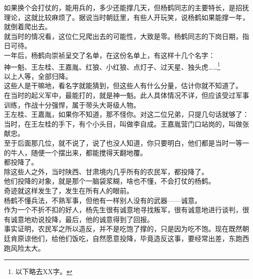 \begin{multicols}{\theparacolNo}
如果换个会打仗的，能用兵的，多少还能撑几天，但杨鹤同志的主要特长，是招抚理论，这就比较麻烦了。据说当时朝廷里，有些人开玩笑，说杨鹤如果能撑一年，就倒着爬出去。\\

就当时的情况看，这位仁兄爬出去的可能性，大致是零。杨鹤同志的下岗日期，指日可待。\\

一年后，杨鹤向崇祯呈交了名单，在这份名单上，有这样十几个名字：\\

神一魁、王左桂、王嘉胤、红狼、小红狼、点灯子、过天星、独头虎……\footnote{以下略去XX字。}\\

以上人等，全部归降。\\

这些人是干嘛地，看名字就能猜到，但这些人有什么分量，估计你就不知道了。\\

在当时的起义军中，最能打的，就是神一魁。此人具体情况不详，但应该受过军事训练，作战十分强悍，属于带头大哥级人物。\\

王左桂、王嘉胤，如果你不知道，那不怪你。对这二位兄弟，只提几句话就够了：当时，在王左桂的手下，有个小头目，叫做李自成。王嘉胤营门口站岗的，叫做张献忠。\\

至于后面那几位，就不说了，说了也没人知道，你只要明白，他们都是当时一等一的牛人，随便一个摆出来，都能搅得天翻地覆。\\

都投降了。\\

除这些人之外，当时陕西、甘肃境内几乎所有的农民军，都投降了。\\

他们投降的对象，就是那个一脑袋浆糊，啥也不懂，不会打仗的杨鹤。\\

奇迹就这样发生了，发生在所有人的眼前。\\

杨鹤不懂兵法，不熟军事，但他有一样别人没有的武器——诚意。\\

作为一个不折不扣的好人，杨先生很有诚意地寻找叛军，很有诚意地进行谈判，很有诚意地劝说投降，最后，他的诚意得到了回报。\\

事实证明，农民军之所以造反，并不是吃饱了撑的，只是因为吃不饱。现在既然朝廷肯原谅他们，给他们饭吃，自然愿意投降，毕竟造反这事，要经常出差，东跑西跑风险太大。\\


\end{multicols}
